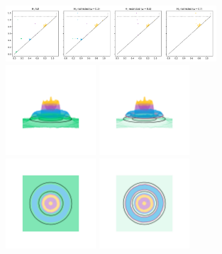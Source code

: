 
\begin{figure}[htbp]
  \centering
  \includegraphics[trim=0 0 525 0, clip, width=0.7\textwidth]{scripts/figures/matching2/dgm-0.png}\\
  \includegraphics[trim=500 800 500 800, clip, width=0.3\textwidth]{scripts/figures/matching2/surf_side-0.png}
  \includegraphics[trim=500 800 500 800, clip, width=0.3\textwidth]{scripts/figures/matching2/surf_side-0_0.png}\\
  \includegraphics[trim=500 500 500 500, clip, width=0.3\textwidth]{scripts/figures/matching2/surf_top-0.png}
  \includegraphics[trim=500 500 500 500, clip, width=0.3\textwidth]{scripts/figures/matching2/surf_top-0_0.png}
\end{figure}

